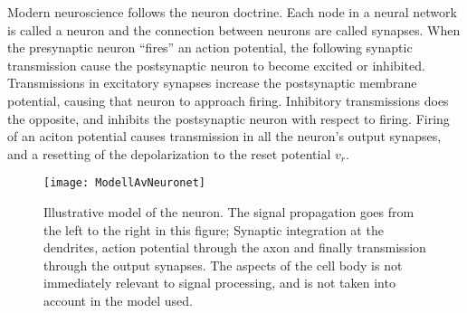 	Modern neuroscience follows the neuron doctrine. 
	Each node in a neural network is called a neuron and the connection between neurons are called synapses.
	When the presynaptic neuron ``fires'' an action potential, the following synaptic transmission cause the postsynaptic neuron to become excited or inhibited.
	Transmissions in excitatory synapses increase the postsynaptic membrane potential, causing that neuron to approach firing. %
	Inhibitory transmissions does the opposite, and inhibits the postsynaptic neuron with respect to firing.
	Firing of an aciton potential causes transmission in all the neuron's output synapses, and a resetting of the depolarization to the reset potential $v_r$. %
	\cite{PrinciplesOfNeuralScience4edKAP02}


\begin{figure}[hbt!p]
	\centering
	\texttt{[image: ModellAvNeuronet]}
	\caption[Illustrative model of the neuron]{Illustrative model of the neuron. The signal propagation goes from the left to the right in this figure;
			Synaptic integration at the dendrites, action potential through the axon and finally transmission through the output synapses. 
			The aspects of the cell body is not immediately relevant to signal processing, and is not taken into account in the model used. }
	\label{figFigurAvNeuronet}
\end{figure}
	
